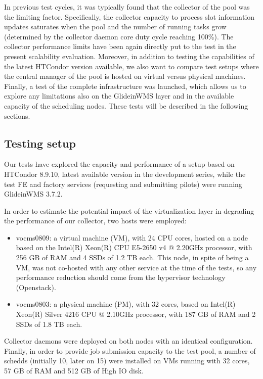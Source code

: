 \documentclass{webofc}
\begin{document}
In previous test cycles, it was typically found that the collector of the pool was the limiting factor. Specifically, the collector capacity to process slot information updates saturates when the pool and the number of running tasks grow (determined by the collector daemon core duty cycle reaching 100\%). The collector performance limits have been again directly put to the test in the present scalability evaluation. Moreover, in addition to testing the capabilities of the latest HTCondor version available, we also want to compare test setups where the central manager of the pool is hosted on virtual versus physical machines. Finally, a test of the complete infrastructure was launched, which allows us to explore any limitations also on the GlideinWMS layer and in the available capacity of the scheduling nodes. These tests will be described in the following sections.

\subsection{Testing setup}
\label{sec:setup}
Our tests have explored the capacity and performance of a setup based on HTCondor 8.9.10, latest available version in the development series, while the test FE and factory services (requesting and submitting pilots) were running GlideinWMS 3.7.2.

In order to estimate the potential impact of the virtualization layer in degrading the performance of our collector, two hosts were employed: 
\begin{itemize}
    \item vocms0809: a virtual machine (VM), with 24 CPU cores, hosted on a node based on the Intel(R) Xeon(R) CPU E5-2650 v4 @ 2.20GHz processor, with 256 GB of RAM and 4 SSDs of 1.2 TB each. This node, in spite of being a VM, was not co-hosted with any other service at the time of the tests, so any performance reduction should come from the hypervisor technology (Openstack). 
    \item vocms0803: a physical machine (PM), with 32 cores, based on Intel(R) Xeon(R) Silver 4216 CPU @ 2.10GHz processor, with 187 GB of RAM and 2 SSDs of 1.8 TB each.
\end{itemize} 

Collector daemons were deployed on both nodes with an identical configuration. Finally, in order to provide job submission capacity to the test pool, a number of schedds (initially 10, later on 15) were installed on VMs running with 32 cores, 57 GB of RAM and 512 GB of High IO disk.
\end{document}
